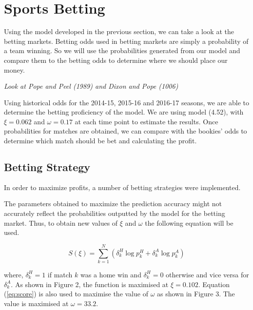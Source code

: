 \chapter{Sports Betting}\label{chapter:betting}

Using the model developed in the previous section, we can take a look at the betting markets.  Betting odds used in betting markets are simply a probability of a team winning.  So we will use the probabilities generated from our model and compare them to the betting odds to determine where we should place our money.

\textit{Look at Pope and Peel (1989) and Dixon and Pope (1006)}

Using historical odds for the 2014-15, 2015-16 and 2016-17 seasons, we are able to determine the betting proficiency of the model.  We are using model (4.52), with $\xi = 0.062$ and $\omega=0.17$ at each time point to estimate the results.  Once probabilities for matches are obtained, we can compare with the bookies' odds to determine which match should be bet and calculating the profit.

\section{Betting Strategy}
In order to maximize profits, a number of betting strategies were implemented.

The parameters obtained to maximize the prediction accuracy might not accurately reflect the probabilities outputted by the model for the betting market.  Thus, to obtain new values of $\xi$ and $\omega$ the following equation will be used.

\begin{equation}\label{eq:score}
S(\xi) = \sum_{k=1}^{N}(\delta_k^H\log p_k^H + \delta_k^A \log p_k^A)
\end{equation}

where, $\delta_k^H = 1$ if match $k$ was a home win and $\delta_k^H=0$ otherwise and vice versa for $\delta_k^A$.  As shown in Figure 2, the function is maximised at $\xi = 0.102$.  Equation (\ref{eq:score}) is also used to maximise the value of $\omega$ as shown in Figure 3.  The value is maximised at $\omega = 33.2$.